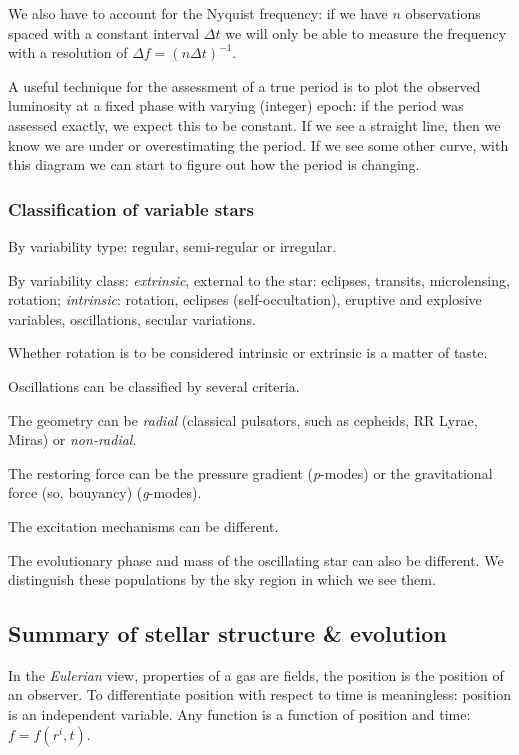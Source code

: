 \documentclass[main.tex]{subfiles}
\begin{document}
We also have to account for the Nyquist frequency: if we have \(n\) observations spaced with a constant interval \(\Delta t\) we will only be able to measure the frequency with a resolution of \(\Delta f = (n \Delta t)^{-1}\). 

A useful technique for the assessment of a true period is to plot the observed luminosity at a fixed phase with varying (integer) epoch: if the period was assessed exactly, we expect this to be constant. 
If we see a straight line, then we know we are under or overestimating the period. If we see some other curve, with this diagram we can start to figure out how the period is changing. 

\subsubsection{Classification of variable stars}

By variability type: regular, semi-regular or irregular.

By variability class: \emph{extrinsic}, external to the star: eclipses, transits, microlensing, rotation; \emph{intrinsic}: rotation, eclipses (self-occultation), eruptive and explosive variables, oscillations, secular variations.

Whether rotation is to be considered intrinsic or extrinsic is a matter of taste.

Oscillations can be classified by several criteria.

The geometry can be \emph{radial} (classical pulsators, such as cepheids, RR Lyrae, Miras) or \emph{non-radial}.

The restoring force can be the pressure gradient (\emph{p}-modes) or the gravitational force (so, bouyancy) (\emph{g}-modes).

The excitation mechanisms can be different.

The evolutionary phase and mass of the oscillating star can also be different. We distinguish these populations by the sky region in which we see them. 

\subsection{Summary of stellar structure \& evolution}

In the \emph{Eulerian} view, properties of a gas are fields, the position is the position of an observer.
To differentiate position with respect to time is meaningless: position is an independent variable. Any function is a function of position and time: \(f = f(r^i, t)\).
\end{document}
